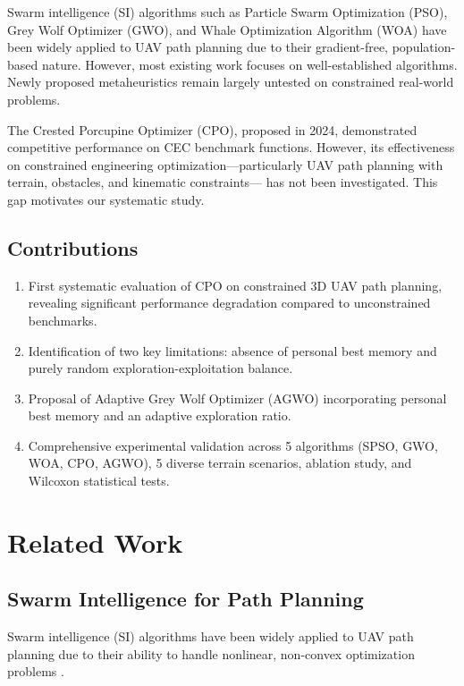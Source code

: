 \documentclass[12pt,a4paper]{article}
\begin{document}
Swarm intelligence (SI) algorithms such as Particle Swarm Optimization
(PSO), Grey Wolf Optimizer (GWO), and Whale Optimization Algorithm (WOA)
have been widely applied to UAV path planning due to their gradient-free,
population-based nature. However, most existing work focuses on
well-established algorithms. Newly proposed metaheuristics remain
largely untested on constrained real-world problems.

The Crested Porcupine Optimizer (CPO), proposed in 2024, demonstrated
competitive performance on CEC benchmark functions. However, its
effectiveness on constrained engineering optimization—particularly
UAV path planning with terrain, obstacles, and kinematic constraints—
has not been investigated. This gap motivates our systematic study.

\subsection{Contributions}
\begin{enumerate}
    \item First systematic evaluation of CPO on constrained 3D UAV path
          planning, revealing significant performance degradation compared
          to unconstrained benchmarks.
    \item Identification of two key limitations: absence of personal best
          memory and purely random exploration-exploitation balance.
    \item Proposal of Adaptive Grey Wolf Optimizer (AGWO) incorporating personal best
          memory and an adaptive exploration ratio.
    \item Comprehensive experimental validation across 5 algorithms
          (SPSO, GWO, WOA, CPO, AGWO), 5 diverse terrain scenarios,
          ablation study, and Wilcoxon statistical tests.
\end{enumerate}

\section{Related Work}

\subsection{Swarm Intelligence for Path Planning}
Swarm intelligence (SI) algorithms have been widely applied to UAV path planning 
due to their ability to handle nonlinear, non-convex optimization problems 
\cite{karaboga2012}.
\end{document}
